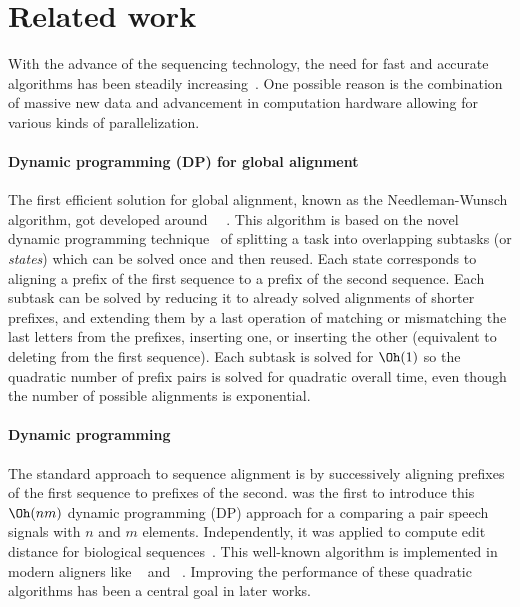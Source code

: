 \section*{Related work}

With the advance of the sequencing technology, the need for fast and accurate
algorithms has been steadily increasing~\cite{alser2021technology}. One possible
reason is the combination of massive new data and advancement in computation
hardware allowing for various kinds of parallelization.

\paragraph{Dynamic programming (DP) for global alignment}
The first efficient solution for global alignment, known as the Needleman-Wunsch
algorithm, got developed around~\citeyear{vintsyuk1968speech}~
\cite{vintsyuk1968speech,needleman1970general}. This algorithm is based on the
novel dynamic programming technique~\cite{bellman1954theory} of splitting a task
into overlapping subtasks (or \emph{states}) which can be solved once and then
reused. Each state corresponds to aligning a prefix of the first sequence to a
prefix of the second sequence. Each subtask can be solved by reducing it to
already solved alignments of shorter prefixes, and extending them by a last
operation of matching or mismatching the last letters from the prefixes,
inserting one, or inserting the other (equivalent to deleting from the first
sequence). Each subtask is solved for $\Oh(1)$ so the quadratic number of prefix
pairs is solved for quadratic overall time, even though the number of possible
alignments is exponential.

\paragraph{Dynamic programming} The standard approach to sequence alignment is
by successively aligning prefixes of the first sequence to prefixes of the
second. \citet{vintsyuk1968speech} was the first to introduce this $\Oh(nm)$
dynamic programming (DP) approach for a comparing a pair speech signals with $n$
and $m$ elements. Independently, it was applied to compute edit distance for
biological
sequences~\citep{needleman1970general,sankoff1972matching,sellers1974theory,wagner1974string}.
This well-known algorithm is implemented in modern aligners  like
\seqan~\citep{reinert2017seqan} and \parasail~\citep{daily2016parasail}.
Improving the performance of these quadratic algorithms has been a central goal
in later works.

